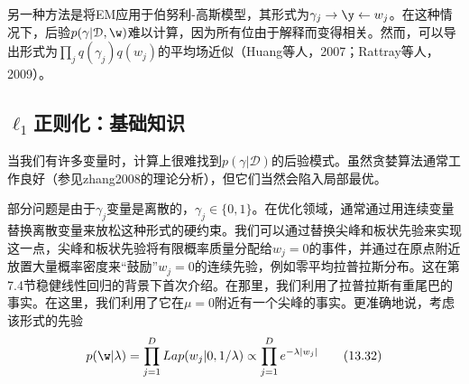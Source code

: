 \documentclass[a4paper]{article}
\begin{document}
另一种方法是将EM应用于伯努利-高斯模型，其形式为$\gamma_j\to \y \gets w_j$。在这种情况下，后验$p(\gamma|\mathcal{D},\w)$难以计算，因为所有位由于解释而变得相关。然而，可以导出形式为$\prod_jq(\gamma_j)q(w_j)$的平均场近似（Huang等人，2007；Rattray等人，2009）。 

\subsection{$\ell_1$正则化：基础知识}
当我们有许多变量时，计算上很难找到$p(\gamma|\mathcal{D})$的后验模式。虽然贪婪算法通常工作良好（参见zhang2008的理论分析），但它们当然会陷入局部最优。

部分问题是由于$\gamma_j$变量是离散的，$\gamma_j\in \{0,1\}$。在优化领域，通常通过用连续变量替换离散变量来放松这种形式的硬约束。我们可以通过替换尖峰和板状先验来实现这一点，尖峰和板状先验将有限概率质量分配给$w_j=0$的事件，并通过在原点附近放置大量概率密度来“鼓励”$w_j=0$的连续先验，例如零平均拉普拉斯分布。这在第7.4节稳健线性回归的背景下首次介绍。在那里，我们利用了拉普拉斯有重尾巴的事实。在这里，我们利用了它在$\mu=0$附近有一个尖峰的事实。更准确地说，考虑该形式的先验
\begin{equation}
	p(\w|\lambda)=\prod_{j=1}^DLap(w_j|0,1/\lambda)\propto \prod_{j=1}^De^{-\lambda|w_j|}\tag{13.32}
\end{equation}
\end{document}
